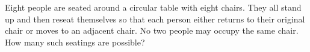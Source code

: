 Eight people are seated around a circular table with eight chairs. They all stand up and then reseat themselves so that each person either returns to their original chair or moves to an adjacent chair. No two people may occupy the same chair. How many such seatings are possible?
